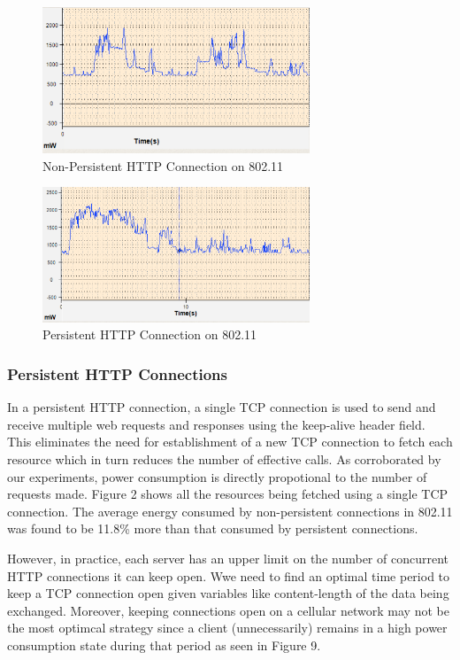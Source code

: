 \documentclass{sigplanconf}
\begin{document}
\begin{figure}[ht!]
\centering
\includegraphics[width=80mm]{powerconsumption2.png}
\caption{Non-Persistent HTTP Connection on 802.11}
\label{fig:sp_gd_mnist}
\end{figure}

\begin{figure}[ht!]
\centering
\includegraphics[width=80mm]{powerconsumption1.png}
\caption{Persistent HTTP Connection on 802.11}
\label{fig:sp_gd_mnist}
\end{figure}

\subsubsection{Persistent HTTP Connections}

In a persistent HTTP connection, a single TCP connection is used to send and receive multiple web requests and responses using the keep-alive header field. This eliminates the need for establishment of a new TCP connection to fetch each resource which in turn reduces the number of effective calls. As corroborated by our experiments, power consumption is directly propotional to the number of requests made. Figure 2 shows all the resources being fetched using a single TCP connection. The average energy consumed by non-persistent connections in 802.11 was found to be 11.8\% more than that consumed by persistent connections.

However, in practice, each server has an upper limit on the number of concurrent HTTP connections it can keep open. Wwe need to find an optimal time period to keep a TCP connection open given variables like content-length of the data being exchanged. Moreover, keeping connections open on a cellular network may not be the most optimcal strategy since a client (unnecessarily) remains in a high power consumption state during that period as seen in Figure 9. 
\end{document}
